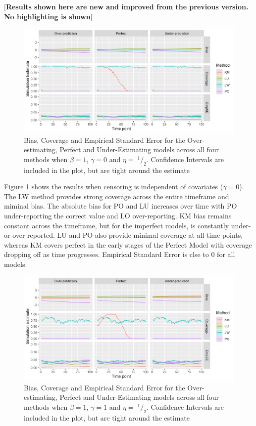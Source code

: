 \documentclass[
]{article}
\newcommand{\sfrac}[2]{\;^{#1}/_{#2}}
\begin{document}
{[}\textbf{Results shown here are new and improved from the previous version. No highlighting is shown}{]}
\begin{figure}
\includegraphics[width=54.68in]{figure/IPCW_Logistic/MainPlot_b(1)_g(0)_e(0.5)} \caption{Bias, Coverage and Empirical Standard Error for the Over-estimating, Perfect and Under-Estimating models across all four methods when $\beta=1$, $\gamma=0$ and $\eta=\sfrac{1}{2}$. Confidence Intervals are included in the plot, but are tight around the estimate}\label{fig:MainPlotg0}
\end{figure}
Figure \ref{fig:MainPlotg0} shows the results when censoring is independent of covariates (\(\gamma=0\)). The LW method provides strong coverage across the entire timeframe and miminal bias. The absolute bias for PO and LU increases over time with PO under-reporting the correct value and LO over-reporting. KM bias remains constant across the timeframe, but for the imperfect models, is constantly under- or over-reported. LU and PO also provide minimal coverage at all time points, whereas KM covers perfect in the early stages of the Perfect Model with coverage dropping off as time progresses. Empirical Standard Error is clse to 0 for all models.
\begin{figure}
\includegraphics[width=54.68in]{figure/IPCW_Logistic/MainPlot_b(1)_g(1)_e(0.5)} \caption{Bias, Coverage and Empirical Standard Error for the Over-estimating, Perfect and Under-Estimating models across all four methods when $\beta=1$, $\gamma=1$ and $\eta=\sfrac{1}{2}$. Confidence Intervals are included in the plot, but are tight around the estimate}\label{fig:MainPlotg1}
\end{figure}
\end{document}
